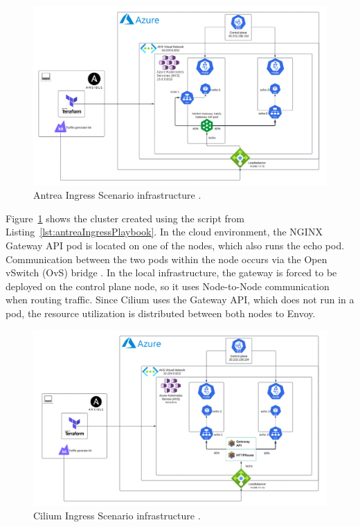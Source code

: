 \begin{figure}[tbh]
  \centering
  \includegraphics[width=1\columnwidth]{images/antrea_cloud_traffic_splitting.png}
  \caption{Antrea Ingress Scenario infrastructure \cite{NGINX}\cite{K6}.}
  \label{fig:antreaIngressScenarioArch}
\end{figure}

Figure~\ref{fig:antreaIngressScenarioArch} shows the cluster created using the script from Listing~\ref{lst:antreaIngressPlaybook}. In the cloud environment, the NGINX Gateway API pod is located on one of the nodes, which also runs the echo pod. Communication between the two pods within the node occurs via the Open vSwitch (OvS) bridge \cite{AntreaDocs}. In the local infrastructure, the gateway is forced to be deployed on the control plane node, so it uses Node-to-Node communication when routing traffic. Since Cilium uses the Gateway API, which does not run in a pod, the resource utilization is distributed between both nodes to Envoy.



\begin{figure}[H]
  \centering
  \includegraphics[width=1\columnwidth]{images/cilium_cloud_traffic_splitting.png}
  \caption{Cilium Ingress Scenario infrastructure \cite{CiliumDocs}\cite{CiliumUseCases}.}
  \label{fig:ciliumIngressScenarioArch}
\end{figure}

